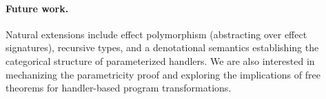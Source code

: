 \documentclass[acmsmall,screen,review,anonymous]{acmart}
\begin{document}
\paragraph{Future work.} Natural extensions include effect polymorphism (abstracting over effect signatures), recursive types, and a denotational semantics establishing the categorical structure of parameterized handlers. We are also interested in mechanizing the parametricity proof and exploring the implications of free theorems for handler-based program transformations.



\end{document}
